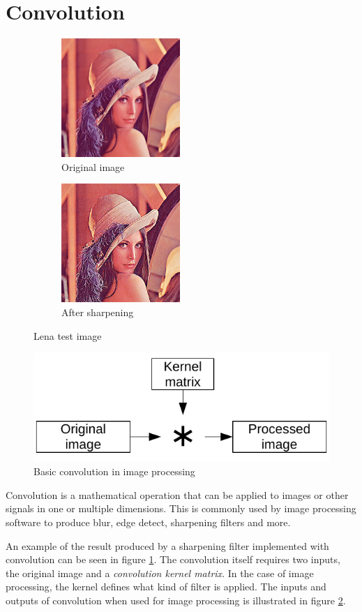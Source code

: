 \section{Convolution}
\begin{figure}
    \centering
    \begin{subfigure}{5cm}
        \centering
        \includegraphics[width=4.5cm]{img/lena}
        \caption{Original image}
    \end{subfigure}
    \begin{subfigure}{5cm}
        \centering
        \includegraphics[width=4.5cm]{img/lenaProcessed}
        \caption{After sharpening}
    \end{subfigure}
    \caption{Lena test image}
    \label{fig:lena}
\end{figure}
\begin{figure}
    \centering
    \includegraphics{img/BasicConvolution}
    \caption{Basic convolution in image processing}
    \label{fig:BasicConvolution}
\end{figure}

Convolution is a mathematical operation that can be applied to images or other signals in one or multiple dimensions.
This is commonly used by image processing software to produce blur, edge detect, sharpening filters and more.

An example of the result produced by a sharpening filter implemented with convolution can be seen in figure \ref{fig:lena}.
The convolution itself requires two inputs, the original image and a \textit{convolution kernel matrix}.
In the case of image processing, the kernel defines what kind of filter is applied.
The inputs and outputs of convolution when used for image processing is illustrated in figure \ref{fig:BasicConvolution}.
